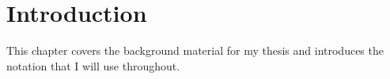 \documentclass[12pt,MSc,twoside]{muthesis}
\begin{document}
\iffalse 
	 
\fi



\chapter{Introduction}
This chapter covers the background material for my thesis and introduces
the notation that I will use throughout.






\end{document}
